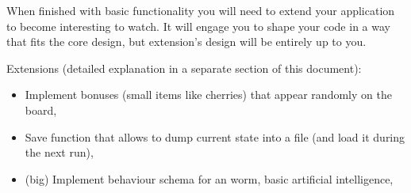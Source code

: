 \documentclass{article}
\begin{document}
When finished with basic functionality you will need to extend your application
to become interesting to watch. It will engage you to shape your code
in a way that fits the core design, but extension's design will be entirely
up to you.

Extensions (detailed explanation in a separate section of this document):
\begin{itemize}
  \item Implement bonuses (small items like cherries) that appear randomly
    on the board,
  \item Save function that allows to dump current state into a file (and load
    it during the next run),
  \item (big) Implement behaviour schema for an worm, basic artificial
    intelligence,
\end{itemize}
\end{document}
